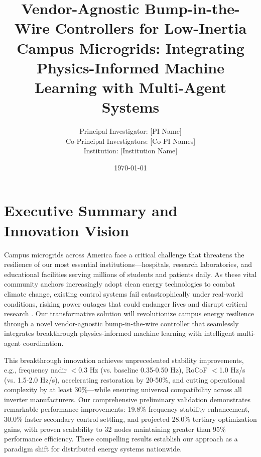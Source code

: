 \documentclass[12pt]{article}
\begin{document}
\title{\Large\textbf{Vendor-Agnostic Bump-in-the-Wire Controllers for Low-Inertia Campus Microgrids: Integrating Physics-Informed Machine Learning with Multi-Agent Systems}}


\author{Principal Investigator: [PI Name]\\
Co-Principal Investigators: [Co-PI Names]\\
Institution: [Institution Name]}

\date{\today}

\maketitle

\section{Executive Summary and Innovation Vision}

Campus microgrids across America face a critical challenge that threatens the resilience of our most essential institutions---hospitals, research laboratories, and educational facilities serving millions of students and patients daily. As these vital community anchors increasingly adopt clean energy technologies to combat climate change, existing control systems fail catastrophically under real-world conditions, risking power outages that could endanger lives and disrupt critical research \cite{molina2020,katiraei2008}. Our transformative solution will revolutionize campus energy resilience through a novel vendor-agnostic bump-in-the-wire controller that seamlessly integrates breakthrough physics-informed machine learning with intelligent multi-agent coordination.

This breakthrough innovation achieves unprecedented stability improvements, e.g., frequency nadir $<$0.3 Hz (vs. baseline 0.35-0.50 Hz), RoCoF $<$1.0 Hz/s (vs. 1.5-2.0 Hz/s), accelerating restoration by 20-50\%, and cutting operational complexity by at least 30\%---while ensuring universal compatibility across all inverter manufacturers. Our comprehensive preliminary validation demonstrates remarkable performance improvements: 19.8\% frequency stability enhancement, 30.0\% faster secondary control settling, and projected 28.0\% tertiary optimization gains, with proven scalability to 32 nodes maintaining greater than 95\% performance efficiency. These compelling results establish our approach as a paradigm shift for distributed energy systems nationwide.
\end{document}

